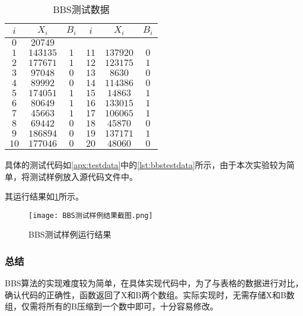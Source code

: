 \documentclass[a4paper, zihao=-4, UTF-8]{ctexart}
\begin{document}
				\begin{table}[htbp]
					\centering
					\begin{tabular}{c|c|c|c|c|c}
						\hline
						$i$  &  $X_i$   & $B_i$ & $i$  &  $X_i$   & $B_i$ \\
						\hline
						$0$  & $20749$  &       &      &          &       \\
						\hline
						$1$  & $143135$ & $ 1 $ & $11$ & $137920$ & $ 0 $ \\
						\hline
						$2$  & $177671$ & $ 1 $ & $12$ & $123175$ & $ 1 $ \\
						\hline
						$3$  & $97048$  & $ 0 $ & $13$ & $8630$   & $ 0 $ \\
						\hline
						$4$  & $89992$  & $ 0 $ & $14$ & $114386$ & $ 0 $ \\
						\hline
						$5$  & $174051$ & $ 1 $ & $15$ & $14863$  & $ 1 $ \\
						\hline
						$6$  & $80649$  & $ 1 $ & $16$ & $133015$ & $ 1 $ \\
						\hline
						$7$  & $45663$  & $ 1 $ & $17$ & $106065$ & $ 1 $ \\
						\hline
						$8$  & $69442$  & $ 0 $ & $18$ & $45870 $ & $ 0 $ \\
						\hline
						$9$  & $186894$ & $ 0 $ & $19$ & $137171$ & $ 1 $ \\
						\hline
						$10$ & $177046$ & $ 0 $ & $20$ & $48060$  & $ 0 $ \\
						\hline
					\end{tabular}
					\caption{BBS测试数据}
					\label{tab:bbstestdata}
				\end{table}

				具体的测试代码如\cref{apx:testdata}中的\cref{lst:bbstestdata}所示，由于本次实验较为简单，将测试样例放入源代码文件中。

				其运行结果如\cref{fig:BBS_result}所示。

				\begin{figure}[htbp]
					\centering
					\texttt{[image: BBS测试样例结果截图.png]}
					\caption{BBS测试样例运行结果}
					\label{fig:BBS_result}
				\end{figure}
				
			
			\subsubsection{总结}
				BBS算法的实现难度较为简单，在具体实现代码中，为了与表格的数据进行对比，确认代码的正确性，函数返回了X和B两个数组。实际实现时，无需存储X和B数组，仅需将所有的B压缩到一个数中即可，十分容易修改。
			
\end{document}
